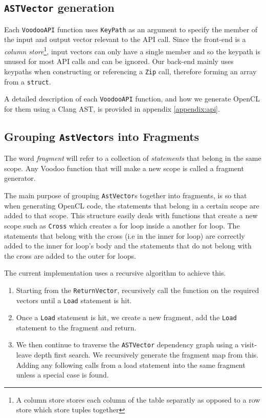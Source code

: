\subsection{\texttt{ASTVector} generation}

Each \texttt{VoodooAPI} function uses \texttt{KeyPath} as an argument to specify the member of the input and output vector relevant to the API call. Since the front-end is a \emph{column store}\footnote{A column store stores each column of the table separatly as opposed to a row store which store tuples together}, input vectors can only have a single member and so the keypath is unused for most API calls and can be ignored. Our back-end mainly uses keypaths when constructing or referencing a \texttt{Zip} call, therefore forming an array from a \texttt{struct}.

A detailed description of each \texttt{VoodooAPI} function, and how we generate OpenCL for them using a Clang AST, is provided in appendix \ref{appendix:api}.

\subsection{Grouping \texttt{AstVector}s into Fragments}
The word \emph{fragment} will refer to a collection of \emph{statements} that belong in the same scope. Any Voodoo function that will make a new scope is called a fragment generator.

The main purpose of grouping \texttt{AstVector}s together into fragments, is so that when generating OpenCL code, the statements that belong in a certain scope are added to that scope.
This structure easily deals with functions that create a new scope such as \texttt{Cross} which creates a for loop inside a another for loop. The statements that belong with the cross (i.e in the inner for loop) are correctly added to the inner for loop's body and the statements that do not belong with the cross are added to the outer for loops.

The current implementation uses a recursive algorithm to achieve this. 

\begin{enumerate}
    \item Starting from the \texttt{ReturnVector}, recursively call the function on the required vectors until a \texttt{Load} statement is hit.
    \item Once a \texttt{Load} statement is hit, we create a new fragment, add the \texttt{Load} statement to the fragment and return.
    \item We then continue to traverse the \texttt{ASTVector} dependency graph using a visit-leave depth first search. We recursively generate the fragment map from this. Adding any following calls from a load statement into the same fragment unless a special case is found. 
\end{enumerate}

